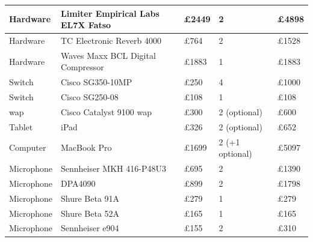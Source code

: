 \begin{longtable}[H]{|p{3cm}|p{4cm}|p{2cm}|p{3cm}|p{2cm}|}
Hardware                           & Limiter Empirical Labs EL7X Fatso  & £2449                         & 2                                  & £4898  \\ \hline
Hardware                           & TC Electronic Reverb 4000          & £764                          & 2                                  & £1528  \\ \hline
Hardware                           & Waves Maxx BCL Digital Compressor  & £1883                         & 1                                  & £1883  \\ \hline
\rowcolor[HTML]{EFEFEF} 
Switch                             & Cisco SG350-10MP                   & £250                          & 4                                  & £1000  \\ \hline
\rowcolor[HTML]{EFEFEF} 
Switch                             & Cisco SG250-08                     & £108                          & 1                                  & £108   \\ \hline
\rowcolor[HTML]{EFEFEF} 
\gls{wap}                     & Cisco Catalyst 9100 \gls{wap} & £300                          & 2 (optional)                       & £600   \\ \hline
Tablet                             & iPad                               & £326                          & 2 (optional)                       & £652   \\ \hline
Computer                           & MacBook Pro                        & £1699                         & 2 (+1 optional)                    & £5097  \\ \hline
\rowcolor[HTML]{EFEFEF} 
Microphone                         & Sennheiser MKH 416-P48U3           & £695                          & 2                                  & £1390  \\ \hline
\rowcolor[HTML]{EFEFEF} 
\cellcolor[HTML]{EFEFEF}Microphone & DPA4090                            & £899                          & 2                                  & £1798  \\ \hline
\rowcolor[HTML]{EFEFEF} 
\cellcolor[HTML]{EFEFEF}Microphone & Shure Beta 91A                     & £279                          & 1                                  & £279   \\ \hline
\rowcolor[HTML]{EFEFEF} 
\cellcolor[HTML]{EFEFEF}Microphone & Shure Beta 52A                     & £165                          & 1                                  & £165   \\ \hline
\rowcolor[HTML]{EFEFEF} 
\cellcolor[HTML]{EFEFEF}Microphone & Sennheiser e904                    & £155                          & 2                                  & £310   \\ \hline

\end{longtable}
